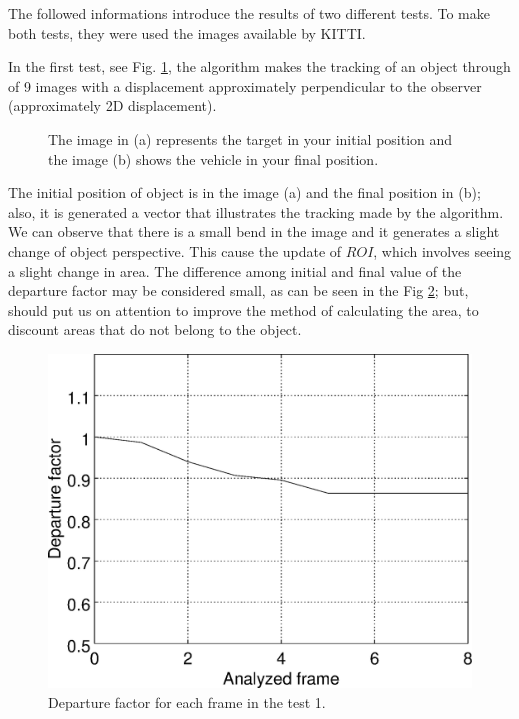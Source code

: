 The followed informations introduce the results of two different tests. 
To make both tests, they were used the images available by KITTI\cite{Geiger}.


In the first test, see Fig. \ref{fig:imgpapercerta}, 
the algorithm makes the tracking of an object through of 9 images with 
a displacement approximately perpendicular to the observer (approximately 2D displacement).
\begin{figure}[!hbt]
\centering
  \caption{The image in (a) represents the target in your initial position 
   and the image (b) shows the vehicle in your final position.}
  \label{fig:imgpapercerta}
\end{figure}
The initial position of object is in the image (a) and the final position in (b); 
also, it is generated a vector that  illustrates the tracking made by the algorithm.
We can observe that there is a small bend in the image 
and it generates a slight change of object perspective. 
This cause the update of $ROI$, which involves seeing a slight change in area.
The difference among initial and final value of the departure factor may 
be considered small, as can be seen in the Fig \ref{fig:res_graph1};
but, should put us on attention to improve the method of calculating the area,
to discount areas that do not belong to the object.
\begin{figure}[!hbt]
\centering
\includegraphics[width=0.8\columnwidth]{images/graph1.eps}
\caption{Departure factor for each frame in the test 1.}
\label{fig:res_graph1}
\end{figure}
